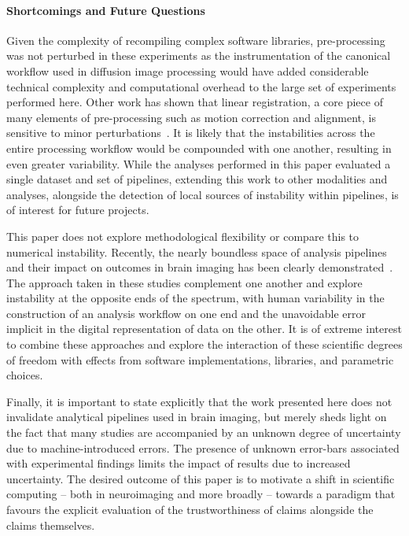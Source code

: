 \documentclass[fleqn,10pt]{SelfArx} %
\newcommand{\new}[1]{{\color{blue} #1}}
\begin{document}
\paragraph{Shortcomings and Future Questions}
Given the complexity of recompiling complex software libraries, pre-processing was not perturbed in these experiments
\new{as the instrumentation of the canonical workflow used in diffusion image processing would have added considerable
technical complexity and computational overhead to the large set of experiments performed here}.
Other work has shown that linear registration, a core piece of many elements of pre-processing such as motion
correction and alignment, is sensitive to minor perturbations~\cite{Glatard2015-vc}. It is likely that the
instabilities across the entire processing workflow would be compounded with one another, resulting in even greater
variability. While the analyses performed in this paper evaluated a single dataset and set of pipelines, extending this
work to other modalities and analyses, \new{alongside the detection of local sources of instability within pipelines},
is of interest for future projects.

This paper does not explore methodological flexibility or compare this to numerical instability. Recently, the nearly
boundless space of analysis pipelines and their impact on outcomes in brain imaging has been clearly
demonstrated~\cite{botvinik2020variability}. The approach taken in these studies complement one another and explore
instability at the opposite ends of the spectrum, with human variability in the construction of an analysis workflow on
one end and the unavoidable error implicit in the digital representation of data on the other. It is of extreme
interest to combine these approaches and explore the interaction of these scientific degrees of freedom with effects
from software implementations, libraries, and parametric choices.

Finally, it is important to state explicitly that the work presented here does not invalidate analytical pipelines used
in brain imaging, but merely sheds light on the fact that many studies are accompanied by an unknown degree of
uncertainty due to machine-introduced errors. The presence of unknown error-bars associated with experimental findings
limits the impact of results due to increased uncertainty. The desired outcome of this paper is to motivate a shift in
scientific computing – both in neuroimaging and more broadly – towards a paradigm \new{that} favours the explicit evaluation
of the trustworthiness of claims alongside the claims themselves.
\end{document}
